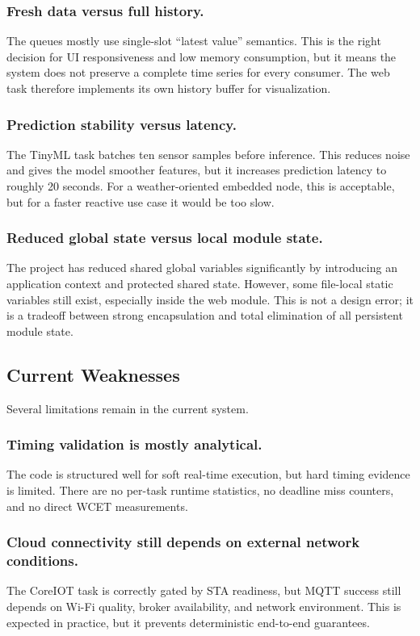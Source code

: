 \subsubsection*{Fresh data versus full history.}
The queues mostly use single-slot ``latest value'' semantics. This is the right
decision for UI responsiveness and low memory consumption, but it means the
system does not preserve a complete time series for every consumer. The web
task therefore implements its own history buffer for visualization.

\subsubsection*{Prediction stability versus latency.}
The TinyML task batches ten sensor samples before inference. This reduces noise
and gives the model smoother features, but it increases prediction latency to
roughly 20 seconds. For a weather-oriented embedded node, this is acceptable,
but for a faster reactive use case it would be too slow.

\subsubsection*{Reduced global state versus local module state.}
The project has reduced shared global variables significantly by introducing an
application context and protected shared state. However, some file-local static
variables still exist, especially inside the web module. This is not a design
error; it is a tradeoff between strong encapsulation and total elimination of
all persistent module state.

\subsection{Current Weaknesses}
Several limitations remain in the current system.

\subsubsection*{Timing validation is mostly analytical.}
The code is structured well for soft real-time execution, but hard timing
evidence is limited. There are no per-task runtime statistics, no deadline miss
counters, and no direct WCET measurements.

\subsubsection*{Cloud connectivity still depends on external network conditions.}
The CoreIOT task is correctly gated by STA readiness, but MQTT success still
depends on Wi-Fi quality, broker availability, and network environment. This is
expected in practice, but it prevents deterministic end-to-end guarantees.


